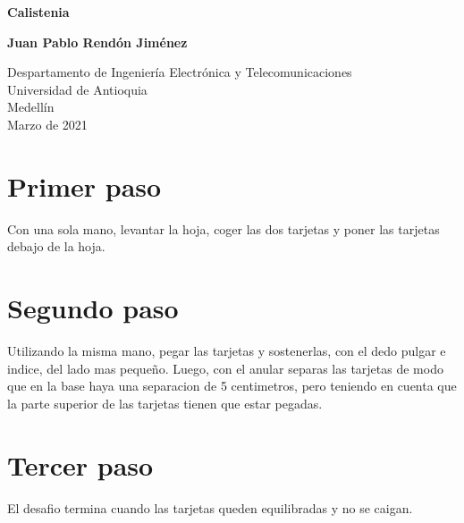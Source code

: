 \documentclass{article}
\begin{document}
\begin{titlepage}
    \begin{center}
        \vspace*{1cm}
            
        \Huge
        \textbf{Calistenia}
            
        \vspace{0.5cm}
        \LARGE
            
        \vspace{1.5cm}
            
        \textbf{Juan Pablo Rendón Jiménez}
            
        \vfill
            
        \vspace{0.8cm}
            
        \Large
        Despartamento de Ingeniería Electrónica y Telecomunicaciones\\
        Universidad de Antioquia\\
        Medellín\\
        Marzo de 2021
            
    \end{center}
\end{titlepage}

\tableofcontents
\newpage
        
\section{Primer paso}\label{intro}
Con una sola mano, levantar la hoja, coger las dos tarjetas y poner las tarjetas debajo de la hoja.

\section{Segundo paso} \label{contenido}
Utilizando la misma mano, pegar las tarjetas y sostenerlas, con el dedo pulgar e indice, del lado mas pequeño. Luego, con el anular separas las tarjetas de modo que en la base haya una separacion de 5 centimetros, pero teniendo en cuenta que la parte superior de las tarjetas tienen que estar pegadas. 

\section{Tercer paso} \label{imagenes}
El desafio termina cuando las tarjetas queden equilibradas y no se caigan.
\end{document}
